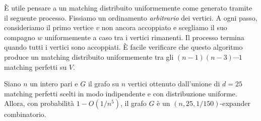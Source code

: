 È utile pensare a un matching distribuito uniformemente come generato tramite
il seguente processo.
Fissiamo un ordinamento \emph{arbitrario} dei vertici. A ogni passo,
consideriamo il primo vertice $v$ non ancora accoppiato e scegliamo il suo
compagno $w$ uniformemente a caso tra i vertici rimanenti.
Il processo termina quando tutti i vertici sono accoppiati.
È facile verificare che questo algoritmo produce un matching distribuito
uniformemente tra gli $(n - 1) (n - 3) \dotsm 1$ matching perfetti
su $V$.


\begin{theorem} \label{thm:random-expander}
	Siano $n$ un intero pari e $G$ il grafo su $n$ vertici ottenuto dall'unione
	di $d = 25$ matching perfetti scelti in modo indipendente e con
	distribuzione uniforme.
	Allora, con probabilità $1 - O(1 / n^5)$, il grafo $G$ è un
	$(n, 25, 1 / 150)$-expander combinatorio.
\end{theorem}

